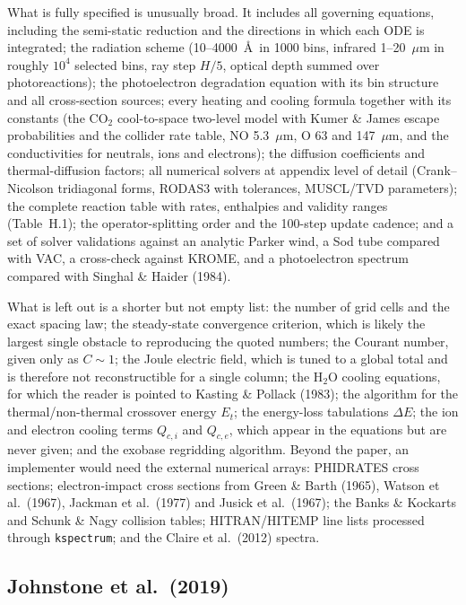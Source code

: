 \documentclass{my_memo}
\begin{document}
What is fully specified is unusually broad. It includes all governing equations, including the
semi-static reduction and the directions in which each ODE is integrated; the radiation scheme
(10--4000~\AA\ in 1000 bins, infrared 1--20~$\mu$m in roughly $10^4$ selected bins, ray step
$H/5$, optical depth summed over photoreactions); the photoelectron degradation equation with its
bin structure and all cross-section sources; every heating and cooling formula together with its
constants (the CO$_2$ cool-to-space two-level model with Kumer \& James escape probabilities and
the collider rate table, NO 5.3~$\mu$m, O 63 and 147~$\mu$m, and the conductivities for neutrals,
ions and electrons); the diffusion coefficients and thermal-diffusion factors; all numerical
solvers at appendix level of detail (Crank--Nicolson tridiagonal forms, RODAS3 with tolerances,
MUSCL/TVD parameters); the complete reaction table with rates, enthalpies and validity ranges
(Table~H.1); the operator-splitting order and the 100-step update cadence; and a set of solver
validations against an analytic Parker wind, a Sod tube compared with VAC, a cross-check against
KROME, and a photoelectron spectrum compared with Singhal \& Haider (1984).

What is left out is a shorter but not empty list: the number of grid cells and the exact spacing
law; the steady-state convergence criterion, which is likely the largest single obstacle to
reproducing the quoted numbers; the Courant number, given only as $C \sim 1$; the Joule electric
field, which is tuned to a global total and is therefore not reconstructible for a single column;
the H$_2$O cooling equations, for which the reader is pointed to Kasting \& Pollack (1983); the
algorithm for the thermal/non-thermal crossover energy $E_t$; the energy-loss tabulations
$\Delta E$; the ion and electron cooling terms $Q_{c,i}$ and $Q_{c,e}$, which appear in the
equations but are never given; and the exobase regridding algorithm. Beyond the paper, an
implementer would need the external numerical arrays: PHIDRATES cross sections; electron-impact
cross sections from Green \& Barth (1965), Watson et al.\ (1967), Jackman et al.\ (1977) and
Jusick et al.\ (1967); the Banks \& Kockarts and Schunk \& Nagy collision tables; HITRAN/HITEMP
line lists processed through \texttt{kspectrum}; and the Claire et al.\ (2012) spectra.

\subsection{Johnstone et al.\ (2019)}
\end{document}

